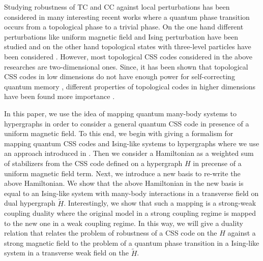 \documentclass[preprintnumbers, showpacs, floatfix,twocolumn,
preprintnumbers, superscriptaddress]{revtex4}
\begin{document}
Studying robustness of TC and CC against local perturbations has been considered in many interesting recent works where a quantum phase transition occurs from a topological phase to a trivial phase. On the one hand different perturbations like uniform magnetic field and Ising perturbation have been studied \cite{vidal2011, jahromi2013, kargar2013, karimipour, zarei2015, zarei2016} and on the other hand topological states with three-level particles have been considered \cite{mohseni}. However, most topological CSS codes considered in the above researches are two-dimensional ones. Since, it has been shown that topological CSS codes in low dimensions do not have enough power for self-correcting quantum memory \cite{bravi}, different properties of topological codes in higher dimensions have been found more importance \cite{Bacon, bombin2016, review2016, zarei2017}.

In this paper, we use the idea of mapping quantum many-body systems to hypergraphs in order to consider a general quantum CSS code in presence of a uniform magnetic field. To this end, we begin with giving a formalism for mapping quantum CSS codes and Ising-like systems to hypergraphs where we use an approach introduced in \cite{zareim}. Then we consider a Hamiltonian as a weighted sum of stabilizers from the CSS code defined on a hypergraph $H$ in precense of a uniform magnetic field term. Next, we introduce a new basis to re-write the above Hamiltonian. We show that the above Hamiltonian in the new basis is equal to an Ising-like system with many-body interactions in a transverse field on dual hypergraph $\tilde{H}$. Interestingly, we show that such a mapping is a strong-weak coupling duality where the original model in a strong coupling regime is mapped to the new one in a weak coupling regime. In this way, we will give a duality relation that relates the problem of robustness of a CSS code on the $H$ against a strong magnetic field to the problem of a quantum phase transition in a Ising-like system in a transverse weak field on the $\tilde{H}$.
\end{document}
